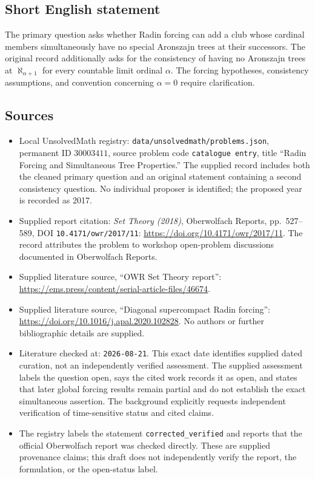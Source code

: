 \documentclass[11pt]{article}
\begin{document}
\subsection{Short English statement}
The primary question asks whether Radin forcing can add a club whose cardinal members simultaneously have no special Aronszajn trees at their successors. The original record additionally asks for the consistency of having no Aronszajn trees at \(\aleph_{\alpha+1}\) for every countable limit ordinal \(\alpha\). The forcing hypotheses, consistency assumptions, and convention concerning \(\alpha=0\) require clarification.
\subsection{Sources}
\begin{itemize}
\item Local UnsolvedMath registry: \texttt{data/unsolvedmath/problems.json}, permanent ID \(30003411\), source problem code \texttt{catalogue entry}, title ``Radin Forcing and Simultaneous Tree Properties.'' The supplied record includes both the cleaned primary question and an original statement containing a second consistency question. No individual proposer is identified; the proposed year is recorded as 2017.
\item Supplied report citation: \emph{Set Theory (2018)}, Oberwolfach Reports, pp.\ 527--589, DOI \texttt{10.4171/owr/2017/11}: \url{https://doi.org/10.4171/owr/2017/11}. The record attributes the problem to workshop open-problem discussions documented in Oberwolfach Reports.
\item Supplied literature source, ``OWR Set Theory report'': \url{https://ems.press/content/serial-article-files/46674}.
\item Supplied literature source, ``Diagonal supercompact Radin forcing'': \url{https://doi.org/10.1016/j.apal.2020.102828}. No authors or further bibliographic details are supplied.
\item Literature checked at: \texttt{2026-08-21}. This exact date identifies supplied dated curation, not an independently verified assessment. The supplied assessment labels the question open, says the cited work records it as open, and states that later global forcing results remain partial and do not establish the exact simultaneous assertion. The background explicitly requests independent verification of time-sensitive status and cited claims.
\item The registry labels the statement \texttt{corrected\_verified} and reports that the official Oberwolfach report was checked directly. These are supplied provenance claims; this draft does not independently verify the report, the formulation, or the open-status label.
\end{itemize}
\end{document}
